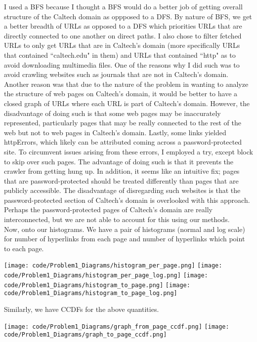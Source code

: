 \documentclass[12 pt]{article}
\begin{document}
	\noindent I used a BFS because I thought a BFS would do a better job of getting overall structure of the Caltech domain as oppposed to a DFS. By nature of BFS, we get a better breadth of URLs as opposed to a DFS which priorities URLs that are directly connected to one another on direct paths. I also chose to filter fetched URLs to only get URLs that are in Caltech's domain (more specifically URLs that contained ``caltech.edu" in them) and URLs that contained ``http" as to avoid downloading multimedia files. One of the reasons why I did such was to avoid crawling websites such as journals that are not in Caltech's domain. Another reason was that due to the nature of the problem in wanting to analyze the structure of web pages on Caltech's domain, it would be better to have a closed graph of URLs where each URL is part of Caltech's domain. However, the disadvantage of doing such is that some web pages may be inaccurately represented, particularly pages that may be really connected to the rest of the web but not to web pages in Caltech's domain. Lastly, some links yielded httpErrors, which likely can be attributed coming across a password-protected site. To circumvent issues arising from these errors, I employed a try, except block to skip over such pages. The advantage of doing such is that it prevents the crawler from getting hung up. In addition, it seems like an intuitive fix; pages that are password-protected should be treated differently than pages that are publicly accessible. The disadvantage of disregarding such websites is that the password-protected section of Caltech's domain is overlooked with this approach. Perhaps the password-protected pages of Caltech's domain are really interconnected, but we are not able to account for this using our methods. \\
	
	\noindent Now, onto our histograms. We have a pair of histograms (normal and log scale) for number of hyperlinks from each page and number of hyperlinks which point to each page.
	\begin{center}
		\texttt{[image: code/Problem1\_Diagrams/histogram\_per\_page.png]}
		\texttt{[image: code/Problem1\_Diagrams/histogram\_per\_page\_log.png]}
		\texttt{[image: code/Problem1\_Diagrams/histogram\_to\_page.png]}
		\texttt{[image: code/Problem1\_Diagrams/histogram\_to\_page\_log.png]}
	\end{center}
	
	\noindent Similarly, we have CCDFs for the above quantities.
	\begin{center}
		\texttt{[image: code/Problem1\_Diagrams/graph\_from\_page\_ccdf.png]}
		\texttt{[image: code/Problem1\_Diagrams/graph\_to\_page\_ccdf.png]}
	\end{center}
\end{document}
